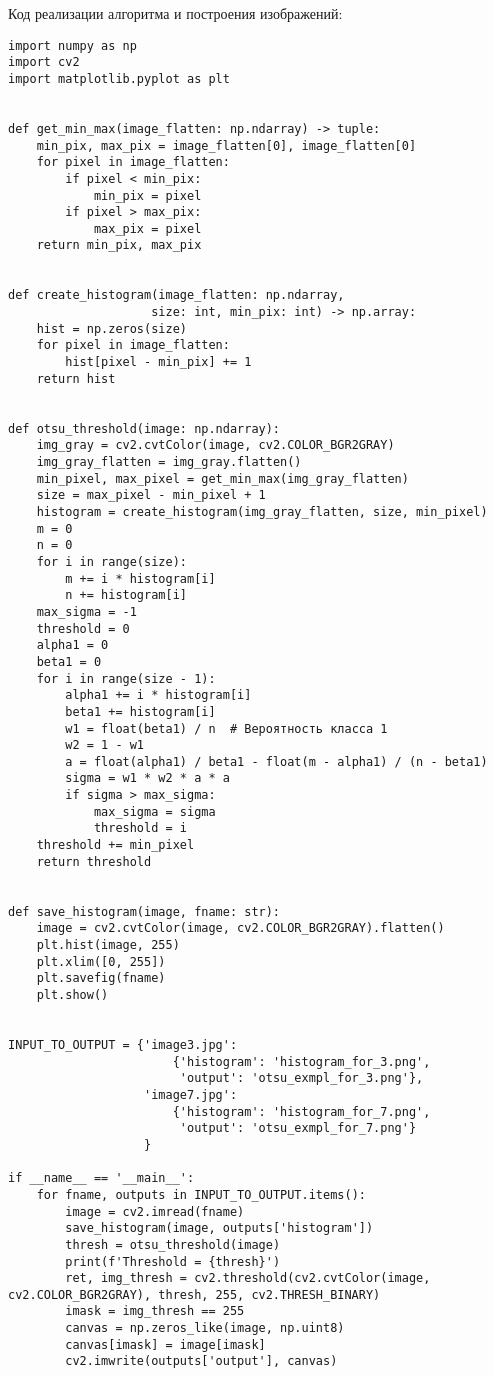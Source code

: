 Код реализации алгоритма и построения изображений:

\begin{verbatim}
import numpy as np
import cv2
import matplotlib.pyplot as plt


def get_min_max(image_flatten: np.ndarray) -> tuple:
    min_pix, max_pix = image_flatten[0], image_flatten[0]
    for pixel in image_flatten:
        if pixel < min_pix:
            min_pix = pixel
        if pixel > max_pix:
            max_pix = pixel
    return min_pix, max_pix


def create_histogram(image_flatten: np.ndarray, 
					size: int, min_pix: int) -> np.array:
    hist = np.zeros(size)
    for pixel in image_flatten:
        hist[pixel - min_pix] += 1
    return hist


def otsu_threshold(image: np.ndarray):
    img_gray = cv2.cvtColor(image, cv2.COLOR_BGR2GRAY)
    img_gray_flatten = img_gray.flatten()
    min_pixel, max_pixel = get_min_max(img_gray_flatten)
    size = max_pixel - min_pixel + 1
    histogram = create_histogram(img_gray_flatten, size, min_pixel)
    m = 0
    n = 0
    for i in range(size):
        m += i * histogram[i]
        n += histogram[i]
    max_sigma = -1
    threshold = 0
    alpha1 = 0
    beta1 = 0
    for i in range(size - 1):
        alpha1 += i * histogram[i]
        beta1 += histogram[i]
        w1 = float(beta1) / n  # Вероятность класса 1
        w2 = 1 - w1
        a = float(alpha1) / beta1 - float(m - alpha1) / (n - beta1) 
        sigma = w1 * w2 * a * a
        if sigma > max_sigma:
            max_sigma = sigma
            threshold = i
    threshold += min_pixel
    return threshold


def save_histogram(image, fname: str):
    image = cv2.cvtColor(image, cv2.COLOR_BGR2GRAY).flatten()
    plt.hist(image, 255)
    plt.xlim([0, 255])
    plt.savefig(fname)
    plt.show()


INPUT_TO_OUTPUT = {'image3.jpg':
                       {'histogram': 'histogram_for_3.png',
                        'output': 'otsu_exmpl_for_3.png'},
                   'image7.jpg':
                       {'histogram': 'histogram_for_7.png',
                        'output': 'otsu_exmpl_for_7.png'}
                   }

if __name__ == '__main__':
    for fname, outputs in INPUT_TO_OUTPUT.items():
        image = cv2.imread(fname)
        save_histogram(image, outputs['histogram'])
        thresh = otsu_threshold(image)
        print(f'Threshold = {thresh}')
        ret, img_thresh = cv2.threshold(cv2.cvtColor(image, cv2.COLOR_BGR2GRAY), thresh, 255, cv2.THRESH_BINARY)
        imask = img_thresh == 255
        canvas = np.zeros_like(image, np.uint8)
        canvas[imask] = image[imask]
        cv2.imwrite(outputs['output'], canvas)
\end{verbatim}

